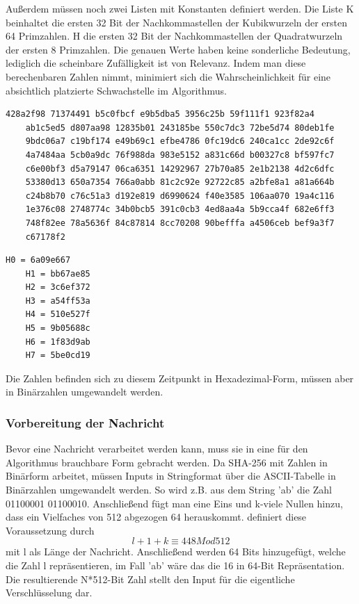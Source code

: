 Außerdem müssen noch zwei Listen mit Konstanten definiert werden. Die Liste K beinhaltet die ersten 32 Bit der Nachkommastellen der Kubikwurzeln der ersten 64 Primzahlen.
H die ersten 32 Bit der Nachkommastellen der Quadratwurzeln der ersten 8 Primzahlen. 
Die genauen Werte haben keine sonderliche Bedeutung, lediglich die scheinbare Zufälligkeit ist von Relevanz. Indem man diese berechenbaren Zahlen nimmt, minimiert sich die Wahrscheinlichkeit für eine absichtlich platzierte Schwachstelle im Algorithmus.
\begin{lstlisting}[caption={Liste K von Konstanten.
	Quelle: \cite{dang_2015}},captionpos=b]
	428a2f98 71374491 b5c0fbcf e9b5dba5 3956c25b 59f111f1 923f82a4 
	ab1c5ed5 d807aa98 12835b01 243185be 550c7dc3 72be5d74 80deb1fe 
	9bdc06a7 c19bf174 e49b69c1 efbe4786 0fc19dc6 240ca1cc 2de92c6f 
	4a7484aa 5cb0a9dc 76f988da 983e5152 a831c66d b00327c8 bf597fc7
	c6e00bf3 d5a79147 06ca6351 14292967 27b70a85 2e1b2138 4d2c6dfc
	53380d13 650a7354 766a0abb 81c2c92e 92722c85 a2bfe8a1 a81a664b 
	c24b8b70 c76c51a3 d192e819 d6990624 f40e3585 106aa070 19a4c116 
	1e376c08 2748774c 34b0bcb5 391c0cb3 4ed8aa4a 5b9cca4f 682e6ff3 
	748f82ee 78a5636f 84c87814 8cc70208 90befffa a4506ceb bef9a3f7 
	c67178f2
\end{lstlisting}
\begin{lstlisting}[caption={Liste mit den Arbeitsvariablen H0 - H7.
	Quelle: \cite{dang_2015}},captionpos=b]
	H0 = 6a09e667
	H1 = bb67ae85
	H2 = 3c6ef372
	H3 = a54ff53a
	H4 = 510e527f
	H5 = 9b05688c
	H6 = 1f83d9ab
	H7 = 5be0cd19
\end{lstlisting}
Die Zahlen befinden sich zu diesem Zeitpunkt in Hexadezimal-Form, müssen aber in Binärzahlen umgewandelt werden.
\subsubsection{Vorbereitung der Nachricht}
Bevor eine Nachricht verarbeitet werden kann, muss sie in eine für den Algorithmus brauchbare Form gebracht werden. 
Da SHA-256 mit Zahlen in Binärform arbeitet, müssen Inputs in Stringformat über die ASCII-Tabelle in Binärzahlen umgewandelt werden. So wird z.B. aus dem String 'ab' die Zahl 01100001 01100010.
Anschließend fügt man eine Eins und k-viele Nullen hinzu, dass ein Vielfaches von 512 abgezogen 64 herauskommt. \cite{dang_2015} definiert diese Voraussetzung durch
$$l+1+k \equiv 448 Mod512$$
mit l als Länge der Nachricht. Anschließend werden 64 Bits hinzugefügt, welche die Zahl l repräsentieren, im Fall 'ab' wäre das die 16 in 64-Bit Repräsentation. Die resultierende N*512-Bit Zahl stellt den Input für die eigentliche Verschlüsselung dar.

